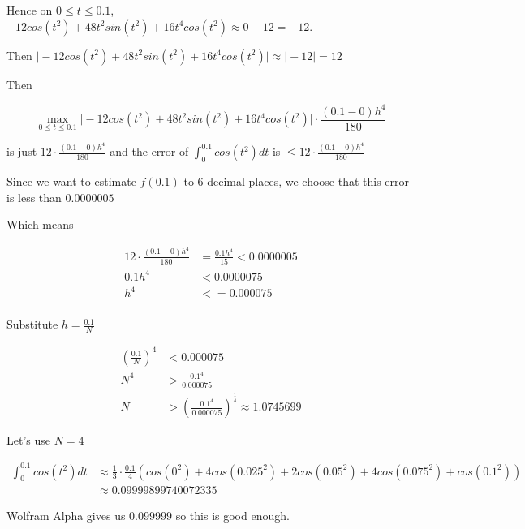 \documentclass[9pt]{article}
\begin{document}
Hence on $0 \leq t \leq 0.1$, $-12cos(t^2) + 48t^2sin(t^2) + 16t^4cos(t^2) \approx 0 - 12 = -12$.

Then $\Big|-12cos(t^2) + 48t^2sin(t^2) + 16t^4cos(t^2) \Big| \approx \Big|-12\Big| = 12$

Then

\begin{equation*}
\max_{0 \leq t \leq 0.1} \Big| -12cos(t^2) + 48t^2sin(t^2) + 16t^4cos(t^2) \Big| \cdot \frac{(0.1 - 0)h^4}{180}
\end{equation*}

is just $12 \cdot \frac{(0.1 - 0)h^4}{180}$ and the error of $\int_0^{0.1} cos(t^2) dt$ is $\leq 12 \cdot \frac{(0.1 - 0)h^4}{180}$

Since we want to estimate $f(0.1)$ to 6 decimal places, we choose that this error is less than $0.0000005$

Which means

\begin{align*}
  12 \cdot \frac{(0.1 - 0)h^4}{180} &= \frac{0.1h^4}{15} < 0.0000005 \\
  0.1 h^4 &< 0.0000075 \\
  h^4 &<= 0.000075 \\
\end{align*}

Substitute $h = \frac{0.1}{N}$

\begin{align*}
  (\frac{0.1}{N})^4 &< 0.000075 \\
  N^4 &> \frac{0.1^4}{0.000075} \\
  N &> (\frac{0.1^4}{0.000075})^{\frac{1}{4}} \approx 1.0745699
\end{align*}

Let's use $N = 4$

\begin{align*}
  \int_{0}^{0.1} cos(t^2) dt &\approx \frac{1}{3} \cdot \frac{0.1}{4} (cos(0^2) + 4cos(0.025^2) + 2cos(0.05^2) + 4cos(0.075^2) + cos(0.1^2)) \\
  &\approx 0.09999899740072335
\end{align*}

Wolfram Alpha gives us $0.099999$ so this is good enough.
\end{document}
